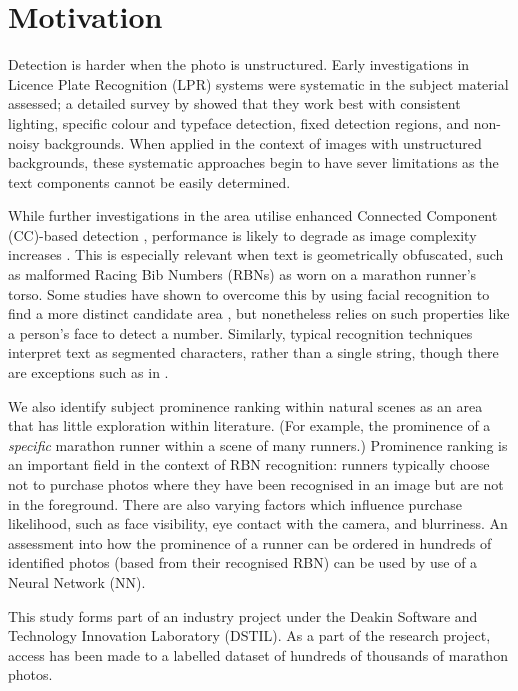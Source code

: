 \section{Motivation}
\label{sec:introduction:motivation}

Detection is harder when the photo is unstructured. Early investigations in Licence Plate Recognition (LPR) systems were systematic in the subject material assessed; a detailed survey by \cite{Anagnostopoulos:2008vu} showed that they work best  with consistent lighting, specific colour and typeface detection, fixed detection regions, and non-noisy backgrounds. When applied in the context of images with unstructured backgrounds, these systematic approaches begin to have sever limitations as the text components cannot be easily determined.

While further investigations in the area utilise enhanced Connected Component (CC)-based detection \citep{Chen:2011ul,Shivakumara:2011dl,Epshtein:2010tj}, performance is likely to degrade as image complexity increases \citep{Li:2012wd}. This is especially relevant when text is geometrically obfuscated, such as malformed Racing Bib Numbers (RBNs) as worn on a marathon runner's torso. Some studies have shown to overcome this by using facial recognition to find a more distinct candidate area \citep{Benami:2012jf}, but nonetheless relies on such properties like a person's face to detect a number. Similarly, typical recognition techniques interpret text as segmented characters, rather than a single string, though there are exceptions such as in \cite{Zhu:2016ut}.

We also identify subject prominence ranking within natural scenes as an area that has little exploration within literature. (For example, the prominence of a \textit{specific} marathon runner within a scene of many runners.) Prominence ranking is an important field in the context of RBN recognition: runners typically choose not to purchase photos where they have been recognised in an image but are not in the foreground. There are also varying factors which influence purchase likelihood, such as face visibility, eye contact with the camera, and blurriness. An assessment into how the prominence of a runner can be ordered in hundreds of identified photos (based from their recognised RBN) can be used by use of a Neural Network (NN).

This study forms part of an industry project under the Deakin Software and Technology Innovation Laboratory (DSTIL). As a part of the research project, access has been made to a labelled dataset of hundreds of thousands of marathon photos.


